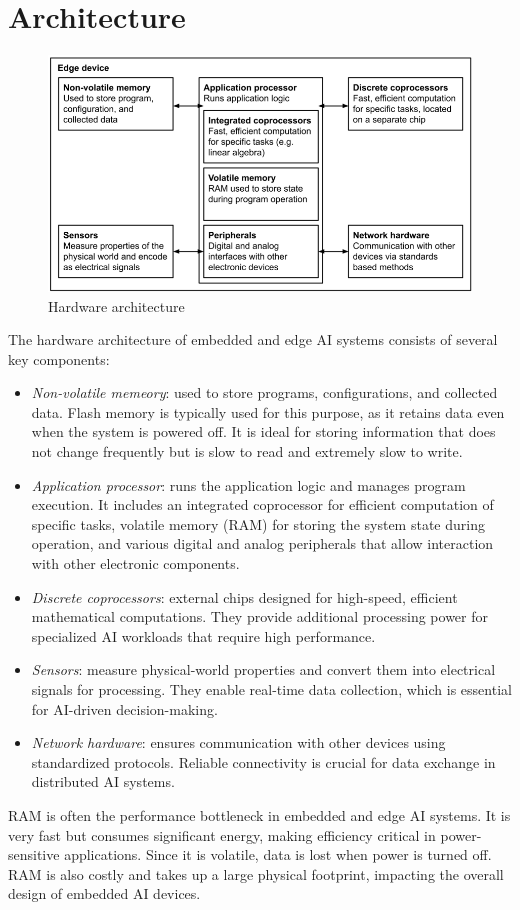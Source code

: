 \section{Architecture}

\begin{figure}[H]
    \centering
    \includegraphics[width=0.5\linewidth]{images/eeai4.png}
    \caption{Hardware architecture}
\end{figure}
The hardware architecture of embedded and edge AI systems consists of several key components:
\begin{itemize}
    \item \textit{Non-volatile memeory}: used to store programs, configurations, and collected data. 
        Flash memory is typically used for this purpose, as it retains data even when the system is powered off. 
        It is ideal for storing information that does not change frequently but is slow to read and extremely slow to write.
    \item \textit{Application processor}: runs the application logic and manages program execution. 
        It includes an integrated coprocessor for efficient computation of specific tasks, volatile memory (RAM) for storing the system state during operation, and various digital and analog peripherals that allow interaction with other electronic components.
    \item \textit{Discrete coprocessors}: external chips designed for high-speed, efficient mathematical computations. 
        They provide additional processing power for specialized AI workloads that require high performance.
    \item \textit{Sensors}: measure physical-world properties and convert them into electrical signals for processing. 
        They enable real-time data collection, which is essential for AI-driven decision-making.
    \item \textit{Network hardware}:  ensures communication with other devices using standardized protocols.
        Reliable connectivity is crucial for data exchange in distributed AI systems.
\end{itemize}
\noindent RAM is often the performance bottleneck in embedded and edge AI systems. 
It is very fast but consumes significant energy, making efficiency critical in power-sensitive applications.
Since it is volatile, data is lost when power is turned off. 
RAM is also costly and takes up a large physical footprint, impacting the overall design of embedded AI devices.